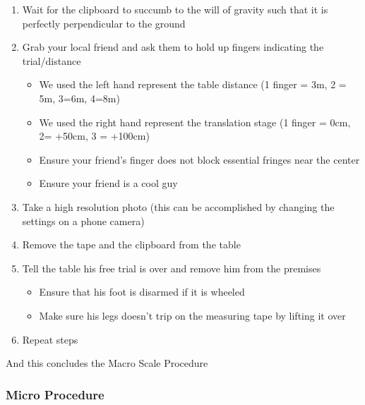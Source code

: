 \documentclass[12pt]{article}
\begin{document}
\begin{enumerate}
\begin{itemize}
        \item Ensure that the whole clipboard is level
    \end{itemize}
    \item Wait for the clipboard to succumb to the will of gravity such that it is perfectly perpendicular to the ground
    \item Grab your local friend and ask them to hold up fingers indicating the trial/distance
\begin{itemize}
    \item We used the left hand represent the table distance (1 finger = 3m, 2 = 5m, 3=6m, 4=8m)
    \item We used the right hand represent the translation stage (1 finger = 0cm, 2= +50cm, 3 = +100cm)
    \item Ensure your friend's finger does not block essential fringes near the center
    \item Ensure your friend is a cool guy
\end{itemize}
    \item Take a high resolution photo (this can be accomplished by changing the settings on a phone camera)
    \item Remove the tape and the clipboard from the table
    \item Tell the table his free trial is over and remove him from the premises
    \begin{itemize}
        \item Ensure that his foot is disarmed if it is wheeled
        \item Make sure his legs doesn't trip on the measuring tape by lifting it over
    \end{itemize}
    \item Repeat steps

\end{enumerate}

And this concludes the Macro Scale Procedure

\subsubsection{Micro Procedure}
\end{document}
